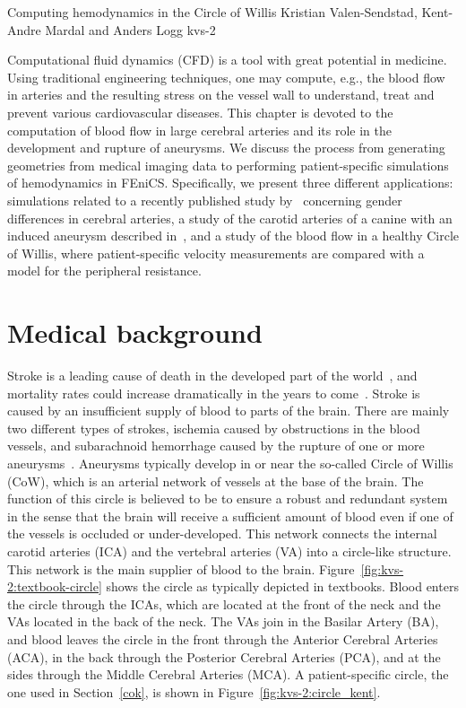               {Computing hemodynamics in the Circle of Willis}
              {Kristian Valen-Sendstad, Kent-Andre Mardal and Anders Logg}
              {kvs-2}

Computational fluid dynamics (CFD) is a tool with great potential in
medicine. Using traditional engineering techniques, one may compute,
e.g., the blood flow in arteries and the resulting stress on the
vessel wall to understand, treat and prevent various cardiovascular
diseases. This chapter is devoted to the computation of blood flow in
large cerebral arteries and its role in the development and rupture of
aneurysms. We discuss the process from generating geometries from
medical imaging data to performing patient-specific simulations of
hemodynamics in FEniCS.  Specifically, we present three different
applications: simulations related to a recently published study
by~\citet{LindekleivValen-SendstadMorganEtAl2010} concerning gender
differences in cerebral arteries, a study of the carotid arteries of a
canine with an induced aneurysm described
in~\citet{JiangJohnsonValen-SendstadEtAl2010}, and a study of the blood
flow in a healthy Circle of Willis, where patient-specific velocity
measurements are compared with a model for the peripheral resistance.

\section{Medical background} \label{Medical_Background}

Stroke is a leading cause of death in the developed part of the
world~\citep{Feigin2005}, and mortality rates could increase
dramatically in the years to come~\citep{MurrayLopez1997}. Stroke is
caused by an insufficient supply of blood to parts of the brain. There
are mainly two different types of strokes, ischemia caused by
obstructions in the blood vessels, and subarachnoid hemorrhage caused
by the rupture of one or more aneurysms~\citep{Humphrey2001}. Aneurysms
typically develop in or near the so-called Circle of Willis (CoW),
which is an arterial network of vessels at the base of the brain. The
function of this circle is believed to be to ensure a robust and
redundant system in the sense that the brain will receive a sufficient
amount of blood even if one of the vessels is occluded or
under-developed. This network connects the internal carotid arteries
(ICA) and the vertebral arteries (VA) into a circle-like
structure. This network is the main supplier of blood to the
brain. Figure~\ref{fig:kvs-2:textbook-circle} shows the circle as
typically depicted in textbooks. Blood enters the circle through the
ICAs, which are located at the front of the neck and the VAs located
in the back of the neck.  The VAs join in the Basilar Artery (BA), and
blood leaves the circle in the front through the Anterior Cerebral
Arteries (ACA), in the back through the Posterior Cerebral Arteries
(PCA), and at the sides through the Middle Cerebral Arteries (MCA). A
patient-specific circle, the one used in Section~\ref{cok}, is shown
in Figure~\ref{fig:kvs-2:circle_kent}.

